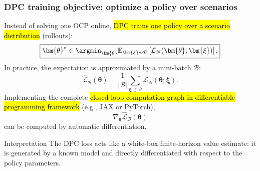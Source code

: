 \begin{frame}
	\frametitle{DPC training objective: optimize a policy over scenarios}
	Instead of solving one OCP online, \hl{DPC trains one policy over a scenario distribution} (rollouts):
	\begin{equation*}
		\boxed{
			\bm{\theta}^{*}\in\argmin_{\bm{\theta}}
			\mathbb{E}_{\bm{\xi}\sim\mathcal{D}}
			\left[\mathcal{L}_{N}(\bm{\theta};\bm{\xi})\right].}
	\end{equation*}\pause%
	In practice, the expectation is approximated by a mini-batch $\mathcal{B}$:
	\begin{equation*}
		\hat{\mathcal{L}}_{\mathcal{B}}(\bm{\theta})
		=\frac{1}{|\mathcal{B}|}\sum_{\bm{\xi}\in\mathcal{B}}\mathcal{L}_{N}(\bm{\theta};\bm{\xi}).
	\end{equation*}\pause%
	Implementing the complete \hl{closed-loop computation graph in differentiable programming framework} (e.g., JAX or PyTorch),
	\begin{equation*}
		\nabla_{\bm{\theta}}\hat{\mathcal{L}}_{\mathcal{B}}(\bm{\theta})
	\end{equation*}
	can be computed by automatic differentiation.\pause%
	\begin{block}{Interpretation}
		The DPC loss acts like a white-box finite-horizon value estimate: it is generated by a known model and directly differentiated with respect to the policy parameters.
	\end{block}
\end{frame}

